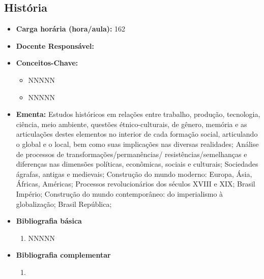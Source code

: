 \documentclass[11pt,fleqn]{book} %
\begin{document}
\subsection{História}\label{disc:historia}
\begin{itemize}
	\item \textbf{Carga horária (hora/aula):} 162
	\item \textbf{Docente Responsável:}
	\item \textbf{Conceitos-Chave:}
	\begin{itemize}
		\item NNNNN
		\item NNNNN
	\end{itemize}
	\item \textbf{Ementa:} Estudos históricos em relações entre trabalho, produção, tecnologia, ciência, meio ambiente, questões étnico-culturais, de gênero, memória e as articulações destes elementos no
	interior de cada formação social, articulando o global e o local, bem como suas implicações nas diversas realidades; 
	Análise de processos de transformações/permanências/ resistências/semelhanças e diferenças nas dimensões políticas, econômicas, sociais e culturais;
	Sociedades ágrafas, antigas e medievais;
	Construção do mundo moderno: Europa, Ásia, Áfricas, Américas;
	Processos revolucionários dos séculos XVIII e XIX; 
	Brasil Império;
	Construção do mundo contemporâneo: do imperialismo à globalização; 
	Brasil República;
	\item \textbf{Bibliografia básica}
	\begin{enumerate}
		\item NNNNN
	\end{enumerate}
	\item \textbf{Bibliografia complementar}
	\begin{enumerate}
		\item 
	\end{enumerate}	
\end{itemize}


\newpage
\end{document}
